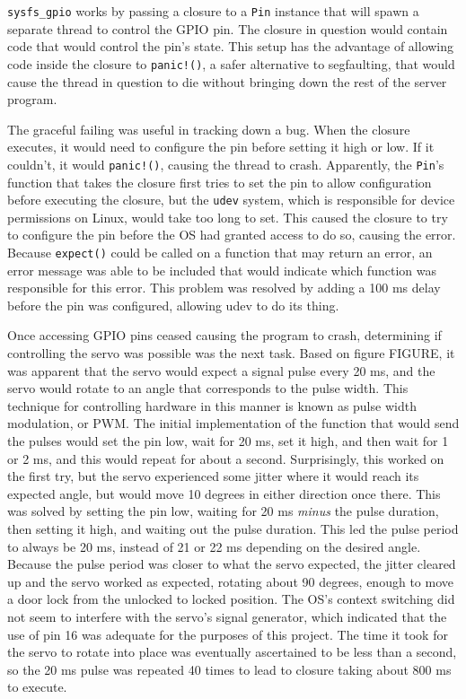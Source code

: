\documentclass[a4paper]{article}
\begin{document}
\texttt{sysfs\_gpio} works by passing a closure to a \texttt{Pin} instance that will spawn a separate thread to control the GPIO pin.
The closure in question would contain code that would control the pin's state.
This setup has the advantage of allowing code inside the closure to \texttt{panic!()}, a safer alternative to segfaulting, that would cause the thread in question to die without bringing down the rest of the server program.

The graceful failing was useful in tracking down a bug.
When the closure executes, it would need to configure the pin before setting it high or low.
If it couldn't, it would \texttt{panic!()}, causing the thread to crash.
Apparently, the \texttt{Pin}'s function that takes the closure first tries to set the pin to allow configuration before executing the closure, but the \texttt{udev} system, which is responsible for device permissions on Linux, would take too long to set.
This caused the closure to try to configure the pin before the OS had granted access to do so, causing the error.
Because \texttt{expect()} could be called on a function that may return an error, an error message was able to be included that would indicate which function was responsible for this error.
This problem was resolved by adding a 100 ms delay before the pin was configured, allowing udev to do its thing.


Once accessing GPIO pins ceased causing the program to crash, determining if controlling the servo was possible was the next task.
Based on figure FIGURE, it was apparent that the servo would expect a signal pulse every 20 ms, and the servo would rotate to an angle that corresponds to the pulse width.
This technique for controlling hardware in this manner is known as pulse width modulation, or PWM.
The initial implementation of the function that would send the pulses would set the pin low, wait for 20 ms, set it high, and then wait for 1 or 2 ms, and this would repeat for about a second.
Surprisingly, this worked on the first try, but the servo experienced some jitter where it would reach its expected angle, but would move 10 degrees in either direction once there.
This was solved by setting the pin low, waiting for 20 ms \emph{minus} the pulse duration, then setting it high, and waiting out the pulse duration.
This led the pulse period to always be 20 ms, instead of 21 or 22 ms depending on the desired angle.
Because the pulse period was closer to what the servo expected, the jitter cleared up and the servo worked as expected, rotating about 90 degrees, enough to move a door lock from the unlocked to locked position.
The OS's context switching did not seem to interfere with the servo's signal generator, which indicated that the use of pin 16 was adequate for the purposes of this project.
The time it took for the servo to rotate into place was eventually ascertained to be less than a second, so the 20 ms pulse was repeated 40 times to lead to closure taking about 800 ms to execute.
\end{document}

